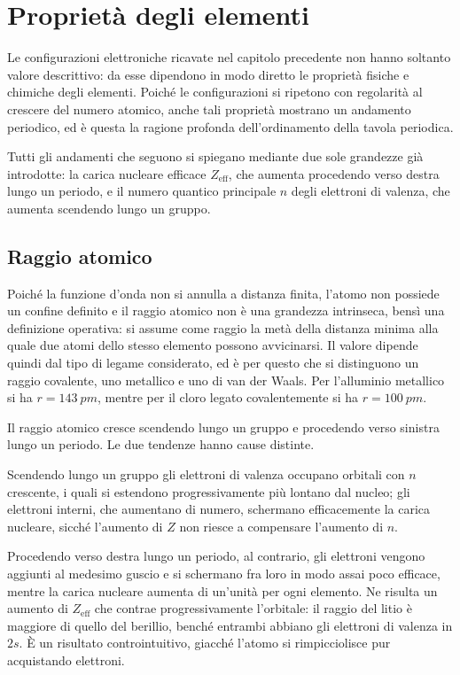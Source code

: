 \chapter{Proprietà degli elementi}

Le configurazioni elettroniche ricavate nel capitolo precedente non hanno soltanto valore descrittivo: da esse dipendono in modo diretto le proprietà fisiche e chimiche degli elementi. 
Poiché le configurazioni si ripetono con regolarità al crescere del numero atomico, anche tali proprietà mostrano un andamento periodico, ed è questa la ragione profonda dell'ordinamento della tavola periodica.

Tutti gli andamenti che seguono si spiegano mediante due sole grandezze già introdotte: la carica nucleare efficace $Z_{\text{eff}}$, che aumenta procedendo verso destra lungo un periodo, e il numero quantico principale $n$ degli elettroni di valenza, che aumenta scendendo lungo un gruppo.

\section{Raggio atomico}

Poiché la funzione d'onda non si annulla a distanza finita, l'atomo non possiede un confine definito e il raggio atomico non è una grandezza intrinseca, bensì una definizione operativa: si assume come raggio la metà della distanza minima alla quale due atomi dello stesso elemento possono avvicinarsi. 
Il valore dipende quindi dal tipo di legame considerato, ed è per questo che si distinguono un raggio covalente, uno metallico e uno di van der Waals. Per l'alluminio metallico si ha $r = 143 \ pm$, mentre per il cloro legato covalentemente si ha $r = 100 \ pm$.

Il raggio atomico cresce scendendo lungo un gruppo e procedendo verso sinistra lungo un periodo. Le due tendenze hanno cause distinte.

Scendendo lungo un gruppo gli elettroni di valenza occupano orbitali con $n$ crescente, i quali si estendono progressivamente più lontano dal nucleo; gli elettroni interni, che aumentano di numero, schermano efficacemente la carica nucleare, sicché l'aumento di $Z$ non riesce a compensare l'aumento di $n$.

Procedendo verso destra lungo un periodo, al contrario, gli elettroni vengono aggiunti al medesimo guscio e si schermano fra loro in modo assai poco efficace, mentre la carica nucleare aumenta di un'unità per ogni elemento. 
Ne risulta un aumento di $Z_{\text{eff}}$ che contrae progressivamente l'orbitale: il raggio del litio è maggiore di quello del berillio, benché entrambi abbiano gli elettroni di valenza in $2s$. È un risultato controintuitivo, giacché l'atomo si rimpicciolisce pur acquistando elettroni.

